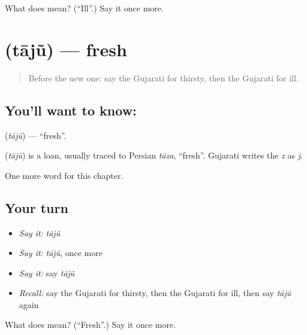 \begin{tcolorbox}[breakable,colback=teal!4,colframe=teal!35!black,title={Before you move on}]
What does  mean? (\textquotedblleft{}Ill\textquotedblright{}.) Say it once more.
\end{tcolorbox}
\section[\texorpdfstring{\gu{તાજું} (tājũ)}{તાજું (tājũ)}]{ (tājũ) — fresh}

\label{lesson:GU-C135-taju}



\begin{quote}
Before the new one: say the Gujarati for thirsty, then the Gujarati for ill.
\end{quote}

\subsection*{You'll want to know: }
\textbf{} (\emph{tājũ}) — \textquotedblleft{}fresh\textquotedblright{}.

\begin{cousinweb}
\textbf{} (\emph{tājũ}) is a loan, usually traced to Persian \emph{tāza}, \textquotedblleft{}fresh\textquotedblright{}. Gujarati writes the \emph{z} as \emph{j}.
\end{cousinweb}

\begin{grammarlens}[title={What you've built}]
One more word for this chapter.
\end{grammarlens}

\subsection*{Your turn}
\begin{itemize}
\raggedright
  \item \emph{Say it:} \emph{tājũ}
  \item \emph{Say it:} \emph{tājũ}, once more
  \item \emph{Say it:} say \emph{tājũ}
  \item \emph{Recall:} say the Gujarati for thirsty, then the Gujarati for ill, then say \emph{tājũ} again
\end{itemize}

\begin{tcolorbox}[breakable,colback=teal!4,colframe=teal!35!black,title={Before you move on}]
What does  mean? (\textquotedblleft{}Fresh\textquotedblright{}.) Say it once more.
\end{tcolorbox}
